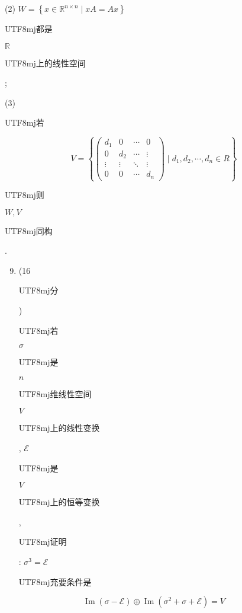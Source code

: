 \documentclass[10pt]{article}
\begin{document}
(2) $W=\left\{x \in \mathbb{R}^{n \times n} \mid x A=A x\right\}$ \begin{CJK}{UTF8}{mj}都是\end{CJK} $\mathbb{R}$ \begin{CJK}{UTF8}{mj}上的线性空间\end{CJK};

(3) \begin{CJK}{UTF8}{mj}若\end{CJK}
$$
V=\left\{\left(\begin{array}{cccc}
d_{1} & 0 & \cdots & 0 \\
0 & d_{2} & \cdots & \vdots \\
\vdots & \vdots & \ddots & \vdots \\
0 & 0 & \cdots & d_{n}
\end{array}\right) \mid d_{1}, d_{2}, \cdots, d_{n} \in R\right\}
$$
\begin{CJK}{UTF8}{mj}则\end{CJK} $W, V$ \begin{CJK}{UTF8}{mj}同构\end{CJK}.

\begin{enumerate}
  \setcounter{enumi}{8}
  \item (16 \begin{CJK}{UTF8}{mj}分\end{CJK}) \begin{CJK}{UTF8}{mj}若\end{CJK} $\sigma$ \begin{CJK}{UTF8}{mj}是\end{CJK} $n$ \begin{CJK}{UTF8}{mj}维线性空间\end{CJK} $V$ \begin{CJK}{UTF8}{mj}上的线性变换\end{CJK}, $\mathscr{E}$ \begin{CJK}{UTF8}{mj}是\end{CJK} $V$ \begin{CJK}{UTF8}{mj}上的恒等变换\end{CJK}, \begin{CJK}{UTF8}{mj}证明\end{CJK}: $\sigma^{3}=\mathscr{E}$ \begin{CJK}{UTF8}{mj}充要条件是\end{CJK}
\end{enumerate}
$$
\operatorname{Im}(\sigma-\mathscr{E}) \oplus \operatorname{Im}\left(\sigma^{2}+\sigma+\mathscr{E}\right)=V
$$
\end{document}

